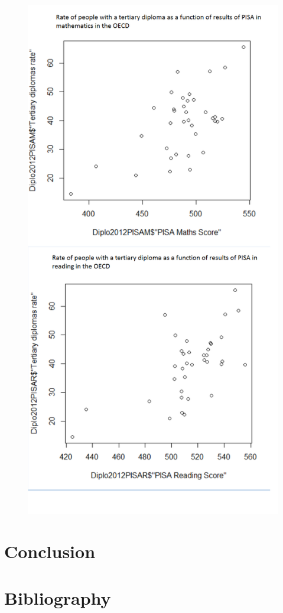 \documentclass[12pt,a4paper]{article}
\begin{document}
\begin{figure}
	\includegraphics[scale=0.4]{img/3DRate.png}
\end{figure}

\section{Conclusion}

\section{Bibliography}
\end{document}
